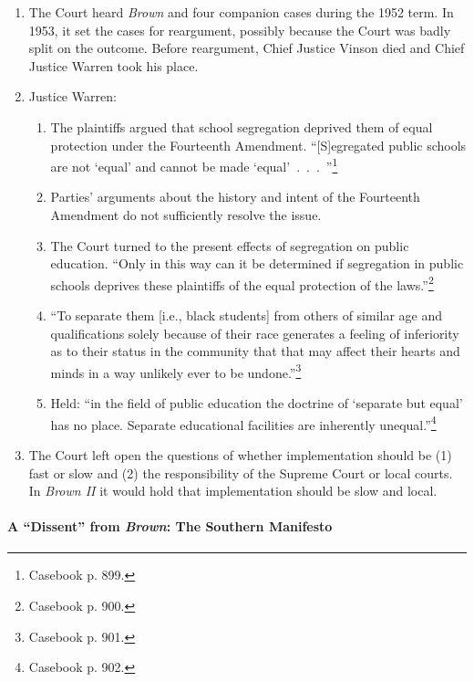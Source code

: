 \begin{enumerate}
    \item The Court heard \emph{Brown} and four companion cases during the 
    1952 term.  In 1953, it set the cases for reargument, possibly because the 
    Court was badly split on the outcome. Before reargument, Chief Justice 
    Vinson died and Chief Justice Warren took his place.
    \item Justice Warren:
    \begin{enumerate}
        \item The plaintiffs argued that school segregation deprived them of 
        equal protection under the Fourteenth Amendment. ``[S]egregated public
        schools are not `equal' and cannot be made 
        `equal'~.~.~.~''\footnote{Casebook p. 899.}
        \item Parties' arguments about the history and intent of the 
        Fourteenth Amendment do not sufficiently resolve the issue.
        \item The Court turned to the present effects of segregation on public 
        education. ``Only in this way can it be determined if segregation in 
        public schools deprives these plaintiffs of the equal protection of 
        the laws.''\footnote{Casebook p. 900.}
        \item ``To separate them [i.e., black students] from others of similar 
        age and qualifications solely because of their race generates a 
        feeling of inferiority as to their status in the community that that 
        may affect their hearts and minds in a way unlikely ever to be 
        undone.''\footnote{Casebook p. 901.}
        \item Held: ``in the field of public education the doctrine of 
        `separate but equal' has no place. Separate educational facilities are 
        inherently unequal.''\footnote{Casebook p. 902.}
    \end{enumerate}
    \item The Court left open the questions of whether implementation should 
    be (1) fast or slow and (2) the responsibility of the Supreme Court or 
    local courts. In \emph{Brown II} it would hold that implementation should 
    be slow and local.
\end{enumerate}

\paragraph{A ``Dissent'' from \emph{Brown}: The Southern Manifesto}

